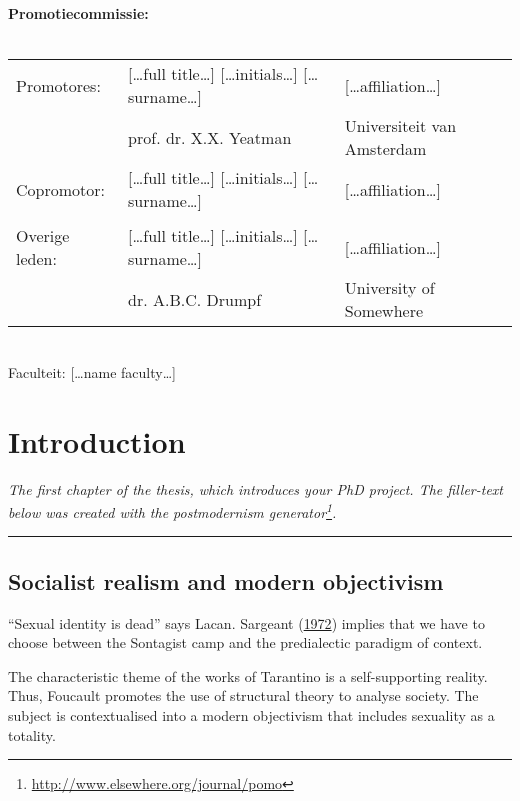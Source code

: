 \documentclass[12pt,english,a4paper,oneside,]{book} %
\renewcommand{\href}[2]{#2\footnote{\url{#1}}}
\let\rmarkdownfootnote\footnote%
\def\footnote{\protect\rmarkdownfootnote}
\renewcommand{\linethickness}{0.05em}
\theoremstyle{definition}
\theoremstyle{definition}
\theoremstyle{definition}
\theoremstyle{remark}
\begin{document}
\clearpage
\thispagestyle{empty}
\noindent\textbf{Promotiecommissie:}\\
\\
\noindent\begin{tabular}{@{}lll}

Promotores:
&  […full title…] […initials…] […surname…] & […affiliation…]\\
&  prof. dr. X.X. Yeatman & Universiteit van Amsterdam\\

Copromotor:
&  […full title…] […initials…] […surname…] & […affiliation…]\\

\\
Overige leden:
&  […full title…] […initials…] […surname…] & […affiliation…]\\
&  dr. A.B.C. Drumpf & University of Somewhere\\
\end{tabular}\\

\noindent Faculteit: […name faculty…]



{
\setcounter{tocdepth}{1}
\tableofcontents
}
\mainmatter
\hypertarget{introduction}{%
\chapter{Introduction}\label{introduction}}

\emph{The first chapter of the thesis, which introduces your PhD project. The filler-text below was created with the \href{http://www.elsewhere.org/journal/pomo}{postmodernism generator}.}

\begin{center}\rule{0.5\linewidth}{\linethickness}\end{center}

\hypertarget{socialist-realism-and-modern-objectivism}{%
\section{Socialist realism and modern objectivism}\label{socialist-realism-and-modern-objectivism}}

``Sexual identity is dead'' says Lacan. Sargeant (\protect\hyperlink{ref-Sargeant1972}{1972}) implies that we have to choose between the Sontagist camp and the predialectic paradigm of context.

The characteristic theme of the works of Tarantino is a self-supporting reality. Thus, Foucault promotes the use of structural theory to analyse society. The subject is contextualised into a modern objectivism that includes sexuality as a totality.
\end{document}

